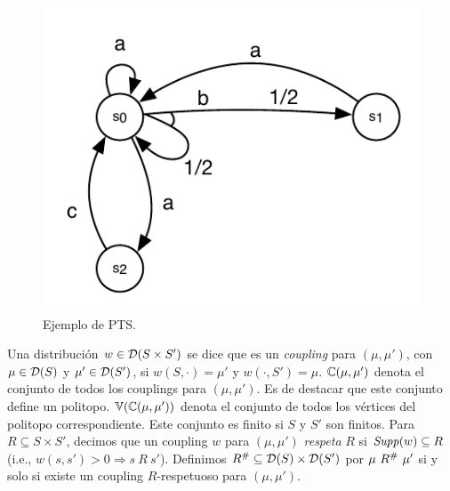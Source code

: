 \begin{figure}[ht] 
\begin{center}
    \includegraphics[scale=0.75]{Figs/examplesThesisPTS.pdf} 
    \caption{Ejemplo de PTS.}
    \label{figure:pts1}
\end{center}
\end{figure}

Una distribución $w \in \mathcal{D}(S \times S')$ se dice que es un \textit{coupling} para $(\mu, \mu')$, con 
$\mu \in \mathcal{D}(S)$ y $\mu' \in \mathcal{D}(S')$, si $w(S, \cdot) = \mu'$ y 
$w(\cdot, S') = \mu$. $\mathbb{C}(\mu,\mu')$ denota el conjunto de todos los couplings para $(\mu, \mu')$.  Es de destacar que este conjunto define un politopo. $\mathbb{V}(\mathbb{C}(\mu,\mu'))$ denota el conjunto de todos los vértices del politopo correspondiente.
Este conjunto es finito si $S$ y $S'$ son finitos.
%
Para $R \subseteq S \times S'$, decimos que un coupling $w$ para $(\mu, \mu')$ 
\textit{respeta} $R$ si $\mathit{Supp}(w) \subseteq R$ (i.e., $w(s, s') > 0 \Rightarrow s~R~s'$).
Definimos $R^{\#} \subseteq \mathcal{D}(S) \times \mathcal{D}(S')$ por $\mu~R^{\#}~\mu'$ si y solo si
existe un coupling $R$-respetuoso para $(\mu, \mu')$.%

